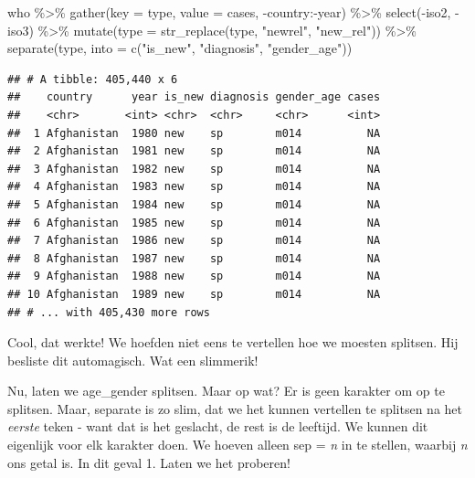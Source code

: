 \documentclass[]{tufte-book}
\newenvironment{Shaded}{}{}
\newcommand{\AttributeTok}[1]{\textcolor[rgb]{0.49,0.56,0.16}{#1}}
\newcommand{\FunctionTok}[1]{\textcolor[rgb]{0.02,0.16,0.49}{#1}}
\newcommand{\NormalTok}[1]{#1}
\newcommand{\SpecialCharTok}[1]{\textcolor[rgb]{0.25,0.44,0.63}{#1}}
\newcommand{\StringTok}[1]{\textcolor[rgb]{0.25,0.44,0.63}{#1}}
\begin{document}
\begin{Shaded}
\begin{Highlighting}[]
\NormalTok{who }\SpecialCharTok{\%\textgreater{}\%}
  \FunctionTok{gather}\NormalTok{(}\AttributeTok{key =}\NormalTok{ type, }\AttributeTok{value =}\NormalTok{ cases, }\SpecialCharTok{{-}}\NormalTok{country}\SpecialCharTok{:{-}}\NormalTok{year) }\SpecialCharTok{\%\textgreater{}\%}
  \FunctionTok{select}\NormalTok{(}\SpecialCharTok{{-}}\NormalTok{iso2, }\SpecialCharTok{{-}}\NormalTok{iso3) }\SpecialCharTok{\%\textgreater{}\%}
  \FunctionTok{mutate}\NormalTok{(}\AttributeTok{type =} \FunctionTok{str\_replace}\NormalTok{(type, }\StringTok{"newrel"}\NormalTok{, }\StringTok{"new\_rel"}\NormalTok{)) }\SpecialCharTok{\%\textgreater{}\%}
  \FunctionTok{separate}\NormalTok{(type, }\AttributeTok{into =} \FunctionTok{c}\NormalTok{(}\StringTok{"is\_new"}\NormalTok{, }\StringTok{"diagnosis"}\NormalTok{, }\StringTok{"gender\_age"}\NormalTok{))}
\end{Highlighting}
\end{Shaded}

\begin{verbatim}
## # A tibble: 405,440 x 6
##    country      year is_new diagnosis gender_age cases
##    <chr>       <int> <chr>  <chr>     <chr>      <int>
##  1 Afghanistan  1980 new    sp        m014          NA
##  2 Afghanistan  1981 new    sp        m014          NA
##  3 Afghanistan  1982 new    sp        m014          NA
##  4 Afghanistan  1983 new    sp        m014          NA
##  5 Afghanistan  1984 new    sp        m014          NA
##  6 Afghanistan  1985 new    sp        m014          NA
##  7 Afghanistan  1986 new    sp        m014          NA
##  8 Afghanistan  1987 new    sp        m014          NA
##  9 Afghanistan  1988 new    sp        m014          NA
## 10 Afghanistan  1989 new    sp        m014          NA
## # ... with 405,430 more rows
\end{verbatim}

Cool, dat werkte! We hoefden niet eens te vertellen hoe we moesten splitsen. Hij besliste dit automagisch. Wat een slimmerik!

Nu, laten we age\_gender splitsen. Maar op wat? Er is geen karakter om op te splitsen. Maar, separate is zo slim, dat we het kunnen vertellen te splitsen na het \emph{eerste} teken - want dat is het geslacht, de rest is de leeftijd. We kunnen dit eigenlijk voor elk karakter doen. We hoeven alleen sep = \emph{n} in te stellen, waarbij \emph{n} ons getal is. In dit geval 1. Laten we het proberen!
\end{document}
